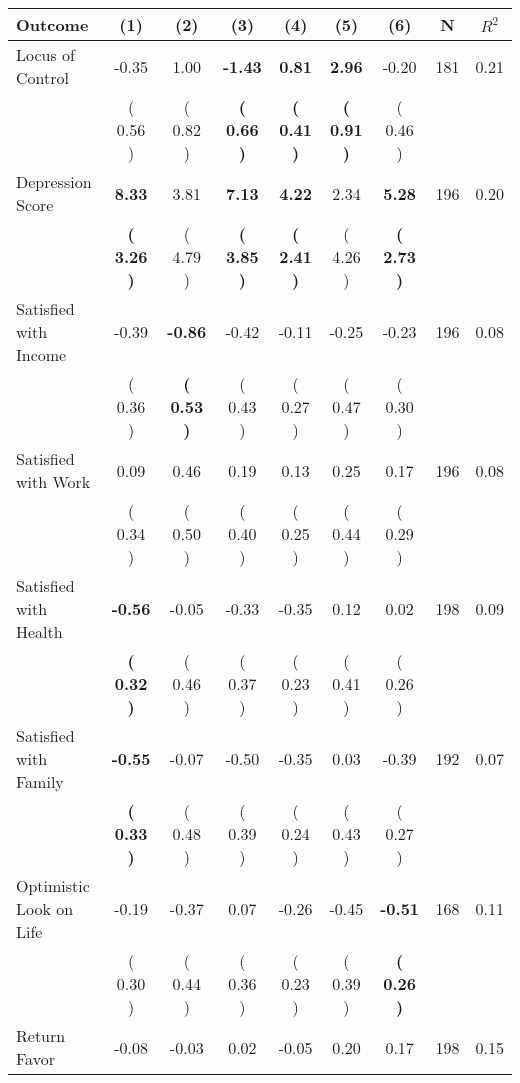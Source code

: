 \begin{tabular}{lcccccccc}
\toprule
 \textbf{Outcome} & \textbf{(1)} & \textbf{(2)} & \textbf{(3)} & \textbf{(4)} & \textbf{(5)} & \textbf{(6)} & \textbf{N} & \textbf{$ R^2$} \\
\midrule
Locus of Control &     -0.35 &      1.00 & \textbf{    -1.43} & \textbf{     0.81} & \textbf{     2.96} &     -0.20 & 181 &       0.21 \\ 
 & (     0.56 ) & (     0.82 ) & \textbf{(     0.66 )} & \textbf{(     0.41 )} & \textbf{(     0.91 )} & (     0.46 ) & \\
Depression Score & \textbf{     8.33} &      3.81 & \textbf{     7.13} & \textbf{     4.22} &      2.34 & \textbf{     5.28} & 196 &       0.20 \\ 
 & \textbf{(     3.26 )} & (     4.79 ) & \textbf{(     3.85 )} & \textbf{(     2.41 )} & (     4.26 ) & \textbf{(     2.73 )} & \\
Satisfied with Income &     -0.39 & \textbf{    -0.86} &     -0.42 &     -0.11 &     -0.25 &     -0.23 & 196 &       0.08 \\ 
 & (     0.36 ) & \textbf{(     0.53 )} & (     0.43 ) & (     0.27 ) & (     0.47 ) & (     0.30 ) & \\
Satisfied with Work &      0.09 &      0.46 &      0.19 &      0.13 &      0.25 &      0.17 & 196 &       0.08 \\ 
 & (     0.34 ) & (     0.50 ) & (     0.40 ) & (     0.25 ) & (     0.44 ) & (     0.29 ) & \\
Satisfied with Health & \textbf{    -0.56} &     -0.05 &     -0.33 &     -0.35 &      0.12 &      0.02 & 198 &       0.09 \\ 
 & \textbf{(     0.32 )} & (     0.46 ) & (     0.37 ) & (     0.23 ) & (     0.41 ) & (     0.26 ) & \\
Satisfied with Family & \textbf{    -0.55} &     -0.07 &     -0.50 &     -0.35 &      0.03 &     -0.39 & 192 &       0.07 \\ 
 & \textbf{(     0.33 )} & (     0.48 ) & (     0.39 ) & (     0.24 ) & (     0.43 ) & (     0.27 ) & \\
Optimistic Look on Life &     -0.19 &     -0.37 &      0.07 &     -0.26 &     -0.45 & \textbf{    -0.51} & 168 &       0.11 \\ 
 & (     0.30 ) & (     0.44 ) & (     0.36 ) & (     0.23 ) & (     0.39 ) & \textbf{(     0.26 )} & \\
Return Favor &     -0.08 &     -0.03 &      0.02 &     -0.05 &      0.20 &      0.17 & 198 &       0.15 \\ 

\end{tabular}

